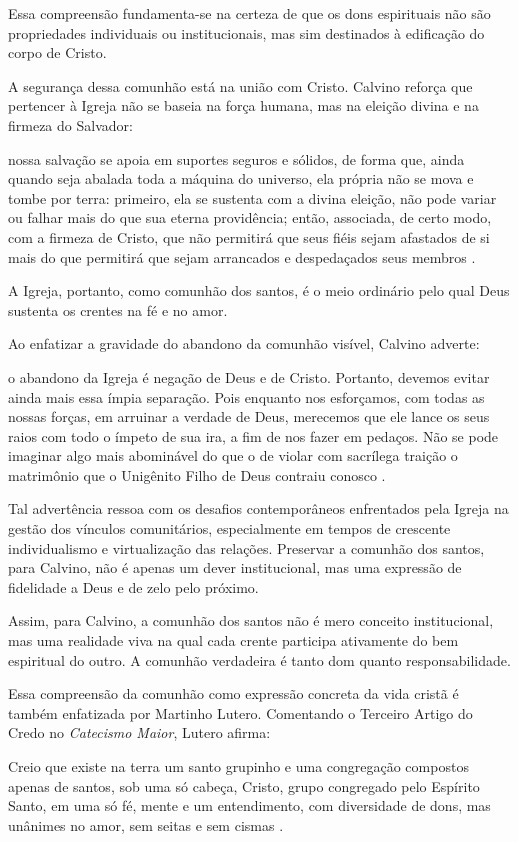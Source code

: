 Essa compreensão fundamenta-se na certeza de que os dons espirituais não são propriedades individuais ou institucionais, mas sim destinados à edificação do corpo de Cristo.

A segurança dessa comunhão está na união com Cristo. Calvino reforça que pertencer à Igreja não se baseia na força humana, mas na eleição divina e na firmeza do Salvador:
\begin{citacao}
nossa salvação se apoia em suportes seguros e sólidos, de forma que, ainda quando seja abalada toda a máquina do universo, ela própria não se mova e tombe por terra: primeiro, ela se sustenta com a divina eleição, não pode variar ou falhar mais do que sua eterna providência; então, associada, de certo modo, com a firmeza de Cristo, que não permitirá que seus fiéis sejam afastados de si mais do que permitirá que sejam arrancados e despedaçados seus membros \cite[v. 4, pp. 1863-1864]{calvino2022}.
\end{citacao}

A Igreja, portanto, como comunhão dos santos, é o meio ordinário pelo qual Deus sustenta os crentes na fé e no amor.

Ao enfatizar a gravidade do abandono da comunhão visível, Calvino adverte:
\begin{citacao}
o abandono da Igreja é negação de Deus e de Cristo. Portanto, devemos evitar ainda mais essa ímpia separação. Pois enquanto nos esforçamos, com todas as nossas forças, em arruinar a verdade de Deus, merecemos que ele lance os seus raios com todo o ímpeto de sua ira, a fim de nos fazer em pedaços. Não se pode imaginar algo mais abominável do que o de violar com sacrílega traição o matrimônio que o Unigênito Filho de Deus contraiu conosco \cite[v. 4, pp. 1877-1878]{calvino2022}.
\end{citacao}

Tal advertência ressoa com os desafios contemporâneos enfrentados pela Igreja na gestão dos vínculos comunitários, especialmente em tempos de crescente individualismo e virtualização das relações. Preservar a comunhão dos santos, para Calvino, não é apenas um dever institucional, mas uma expressão de fidelidade a Deus e de zelo pelo próximo.

Assim, para Calvino, a comunhão dos santos não é mero conceito institucional, mas uma realidade viva na qual cada crente participa ativamente do bem espiritual do outro. A comunhão verdadeira é tanto dom quanto responsabilidade.

Essa compreensão da comunhão como expressão concreta da vida cristã é também enfatizada por Martinho Lutero. Comentando o Terceiro Artigo do Credo no \textit{Catecismo Maior}, Lutero afirma:
\begin{citacao}
Creio que existe na terra um santo grupinho e uma congregação compostos apenas de santos, sob uma só cabeça, Cristo, grupo congregado pelo Espírito Santo, em uma só fé, mente e um entendimento, com diversidade de dons, mas unânimes no amor, sem seitas e sem cismas \cite[p. 454]{livroConcordia}.
\end{citacao}

